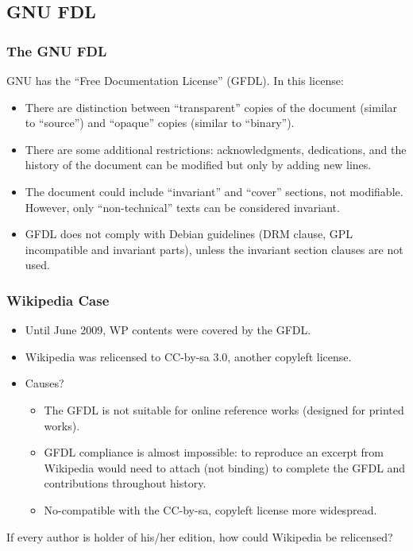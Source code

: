 


\subsection{GNU FDL}
\begin{frame}
\frametitle{The GNU FDL}

GNU has the ``Free Documentation License'' (GFDL). In this license:
\begin{itemize}
\item There are distinction between ``transparent'' copies of the
  document (similar to ``source'') and ``opaque'' copies (similar to
  ``binary'').
\item There are some additional restrictions: acknowledgments,
  dedications, and the history of the document can be modified but
  only by adding new lines.
\item The document could include ``invariant'' and ``cover'' sections, not
  modifiable. However, only ``non-technical'' texts can be considered
  invariant.
\item GFDL does not comply with Debian guidelines (DRM clause, GPL incompatible and 
invariant parts), unless the invariant section clauses are not used. 

\end{itemize}


\end{frame}


\begin{frame}
\frametitle{Wikipedia Case}

\begin{itemize}
\item Until June 2009, WP contents were covered by the GFDL.
\item Wikipedia was relicensed to CC-by-sa 3.0, another copyleft license.
\item Causes? 

\pause

\small
	\begin{itemize}
		\item The GFDL is not suitable for online reference works (designed for printed works). 
		\item GFDL compliance is almost impossible: to reproduce an excerpt from Wikipedia would need to attach (not binding) to complete the GFDL and contributions throughout history.
		\item No-compatible with the CC-by-sa, copyleft license more widespread.
	\end{itemize}

\end{itemize}

\pause
\begin{center}
\alert{If every author is holder of his/her edition, how could Wikipedia be relicensed?}
\end{center}

\end{frame}



